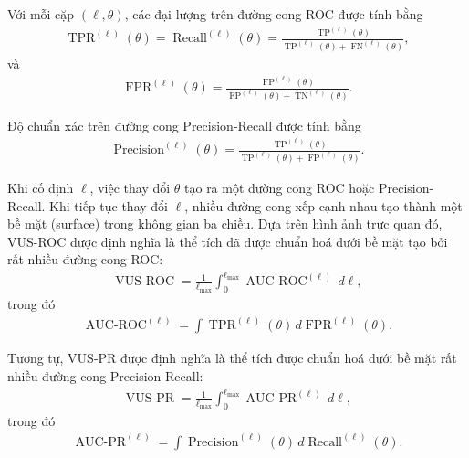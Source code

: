 Với mỗi cặp \((\ell,\theta)\), các đại lượng trên đường cong ROC được tính bằng
\begin{equation}
\begin{aligned}
\operatorname{TPR}^{(\ell)}(\theta)
=
\operatorname{Recall}^{(\ell)}(\theta)
=
\frac{
\operatorname{TP}^{(\ell)}(\theta)
}{
\operatorname{TP}^{(\ell)}(\theta)
+
\operatorname{FN}^{(\ell)}(\theta)
},
\end{aligned}
\end{equation}
và
\begin{equation}
\begin{aligned}
\operatorname{FPR}^{(\ell)}(\theta)
=
\frac{
\operatorname{FP}^{(\ell)}(\theta)
}{
\operatorname{FP}^{(\ell)}(\theta)
+
\operatorname{TN}^{(\ell)}(\theta)
}.
\end{aligned}
\end{equation}

Độ chuẩn xác trên đường cong Precision-Recall được tính bằng
\begin{equation}
\begin{aligned}
\operatorname{Precision}^{(\ell)}(\theta)
=
\frac{
\operatorname{TP}^{(\ell)}(\theta)
}{
\operatorname{TP}^{(\ell)}(\theta)
+
\operatorname{FP}^{(\ell)}(\theta)
}.
\end{aligned}
\end{equation}

Khi cố định \(\ell\), việc thay đổi \(\theta\) tạo ra một đường cong ROC hoặc
Precision-Recall. Khi tiếp tục thay đổi \(\ell\), nhiều đường cong xếp cạnh nhau tạo thành một bề mặt (surface) trong không gian ba chiều. Dựa trên hình ảnh trực quan đó, VUS-ROC được định nghĩa là thể tích đã được chuẩn hoá dưới bề mặt tạo bởi rất nhiều đường cong ROC:
\begin{equation}
\begin{aligned}
\operatorname{VUS\text{-}ROC}
=
\frac{1}{\ell_{\max}}
\int_{0}^{\ell_{\max}}
\operatorname{AUC\text{-}ROC}^{(\ell)}
\,d\ell,
\end{aligned}
\end{equation}
trong đó
\begin{equation}
\begin{aligned}
\operatorname{AUC\text{-}ROC}^{(\ell)}
=
\int
\operatorname{TPR}^{(\ell)}(\theta)
\,d\operatorname{FPR}^{(\ell)}(\theta).
\end{aligned}
\end{equation}

Tương tự, VUS-PR được định nghĩa là thể tích được chuẩn hoá dưới bề mặt rất nhiều đường cong Precision-Recall:
\begin{equation}
\begin{aligned}
\operatorname{VUS\text{-}PR}
=
\frac{1}{\ell_{\max}}
\int_{0}^{\ell_{\max}}
\operatorname{AUC\text{-}PR}^{(\ell)}
\,d\ell,
\end{aligned}
\end{equation}
trong đó
\begin{equation}
\begin{aligned}
\operatorname{AUC\text{-}PR}^{(\ell)}
=
\int
\operatorname{Precision}^{(\ell)}(\theta)
\,d\operatorname{Recall}^{(\ell)}(\theta).
\end{aligned}
\end{equation}

